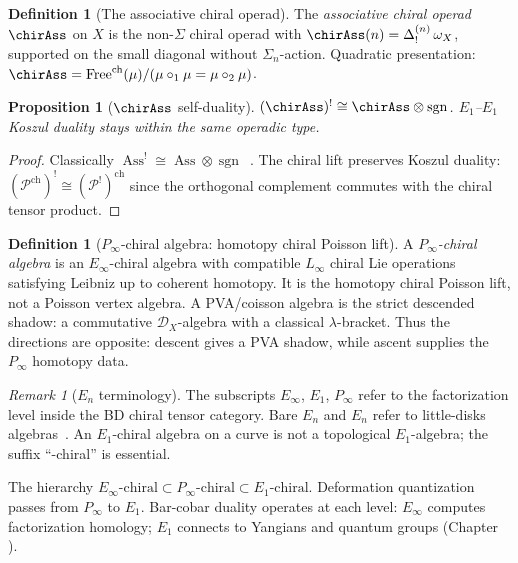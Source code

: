 \documentclass[11pt]{report}
\makeatletter
\newtheorem{proposition}[theorem]{Proposition}
\theoremstyle{definition}
\newtheorem{definition}[theorem]{Definition}
\theoremstyle{remark}
\newtheorem{remark}[theorem]{Remark}
\providecommand{\Eone}{E_1}
\providecommand{\Einf}{E_\infty}
\providecommand{\En}{E_n}
\providecommand{\Pinf}{P_\infty}
\numberwithin{equation}{section}
\let\svy@oldref\ref
\renewcommand{\ref}[1]{%
 \@ifundefined{r@#1}{\textit{full monograph}}{\svy@oldref{#1}}%
}
\makeatother
\begin{document}
\begin{definition}[The associative chiral operad]
\label{def:chiral-ass-operad}
The \emph{associative chiral operad} $\chirAss$ on $X$ is the
non-$\Sigma$ chiral operad with
$\chirAss(n) = \Delta^{(n)}_!\, \omega_X$, supported on the small
diagonal without $\Sigma_n$-action. Quadratic presentation:
$\chirAss = \operatorname{Free}^{\mathrm{ch}}(\mu) /
(\mu \circ_1 \mu = \mu \circ_2 \mu)$.
\end{definition}

\begin{proposition}[\texorpdfstring{$\chirAss$}{Ass-ch} self-duality]
\label{prop:chirAss-self-dual}
$(\chirAss)^! \cong \chirAss \otimes \operatorname{sgn}$.
$\Eone$--$\Eone$ Koszul duality stays within the same operadic
type.
\end{proposition}
\begin{proof}
Classically $\operatorname{Ass}^! \cong \operatorname{Ass} \otimes
\operatorname{sgn}$~\cite[Theorem~7.4.1]{LV12}. The chiral lift
preserves Koszul duality:
$(\mathcal{P}^{\mathrm{ch}})^! \cong (\mathcal{P}^!)^{\mathrm{ch}}$
since the orthogonal complement commutes with the chiral tensor
product.
\end{proof}

\begin{definition}[\texorpdfstring{$\Pinf$}{P-infinity}-chiral algebra: homotopy chiral Poisson lift]
\label{def:pinf-chiral}
A \emph{$\Pinf$-chiral algebra} is an $\Einf$-chiral algebra with
compatible $L_\infty$ chiral Lie operations satisfying Leibniz up to
coherent homotopy. It is the homotopy chiral Poisson lift, not a
Poisson vertex algebra. A PVA/coisson algebra is the strict descended
shadow: a commutative $\mathcal D_X$-algebra with a classical
$\lambda$-bracket. Thus the directions are opposite: descent gives a
PVA shadow, while ascent supplies the $\Pinf$ homotopy data.
\end{definition}

\begin{remark}[\texorpdfstring{$E_n$}{En} terminology]\label{rem:En-terminology}
The subscripts $\Einf$, $\Eone$, $\Pinf$ refer to the
factorization level inside the BD chiral tensor category. Bare
$E_n$ and $\En$ refer to little-disks
algebras~\cite[\S5.1]{HA}. An $\Eone$-chiral algebra on a
curve is not a topological $E_1$-algebra; the suffix
``-chiral'' is essential.
\end{remark}

The hierarchy
$\Einf\text{-chiral} \subset \Pinf\text{-chiral} \subset
\Eone\text{-chiral}$.
Deformation quantization passes from $\Pinf$ to $\Eone$.
Bar-cobar duality operates at each level: $\Einf$ computes
factorization homology; $\Eone$ connects to Yangians and quantum
groups (Chapter~\ref{chap:yangians}).
\end{document}
